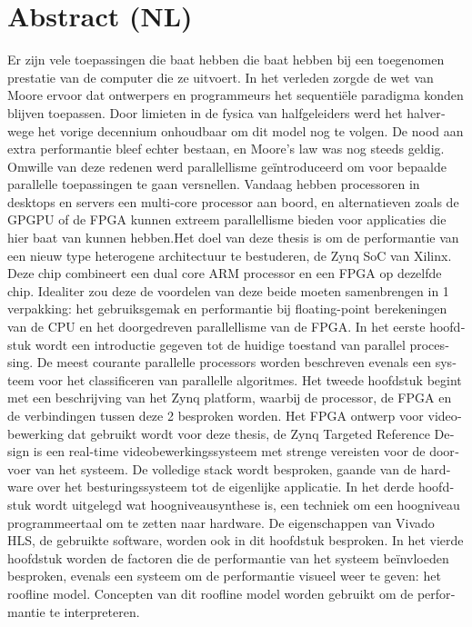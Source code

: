 
\chapter*{Abstract (NL)}

\begin{otherlanguage}{dutch}


Er zijn vele toepassingen die baat hebben die baat hebben bij een toegenomen prestatie van de computer die ze uitvoert. In het verleden zorgde de wet van Moore ervoor dat ontwerpers en programmeurs het sequenti\"ele paradigma konden blijven toepassen. Door limieten in de fysica van halfgeleiders werd het halverwege het vorige decennium onhoudbaar om dit model nog te volgen. De nood aan extra performantie bleef echter bestaan, en Moore's law was nog steeds geldig. Omwille van deze redenen werd parallellisme geïntroduceerd om voor bepaalde parallelle toepassingen te gaan versnellen. Vandaag hebben processoren in desktops en servers een multi-core processor aan boord, en alternatieven zoals de GPGPU of de FPGA kunnen extreem parallellisme bieden voor applicaties die hier baat van kunnen hebben.Het doel van deze thesis is om de performantie van een nieuw type heterogene architectuur te bestuderen, de Zynq SoC van Xilinx. Deze chip combineert een dual core ARM processor en een FPGA op dezelfde chip. Idealiter zou deze de voordelen van deze beide moeten samenbrengen in 1 verpakking: het gebruiksgemak en performantie bij floating-point berekeningen van de CPU en het doorgedreven parallellisme van de FPGA.
In het eerste hoofdstuk wordt een introductie gegeven tot de huidige toestand van parallel processing. De meest courante parallelle processors worden beschreven evenals een systeem voor het classificeren van parallelle algoritmes. Het tweede hoofdstuk begint met een beschrijving van het Zynq platform, waarbij de processor, de FPGA en de verbindingen tussen deze 2 besproken worden. Het FPGA ontwerp voor videobewerking dat gebruikt wordt voor deze thesis, de Zynq Targeted Reference Design is een real-time videobewerkingssysteem met strenge vereisten voor de doorvoer van het systeem. De volledige stack wordt besproken, gaande van de hardware over het besturingssysteem tot de eigenlijke applicatie. In het derde hoofdstuk wordt uitgelegd wat hoogniveausynthese is, een techniek om een hoogniveau programmeertaal om te zetten naar hardware. De eigenschappen van Vivado HLS, de gebruikte software, worden ook in dit hoofdstuk besproken. In het vierde hoofdstuk worden de factoren die de performantie van het systeem be\"invloeden besproken, evenals een systeem om de performantie visueel weer te geven:  het roofline model. Concepten van dit roofline model worden gebruikt om de performantie te interpreteren. 

\end{otherlanguage}